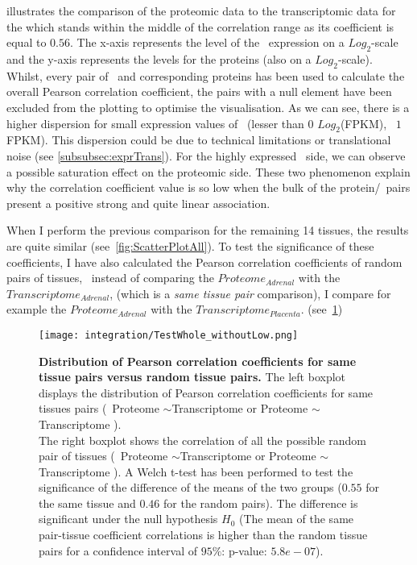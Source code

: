  illustrates the comparison of the proteomic data to the
transcriptomic data for the  which stands within the middle of the
correlation range as its coefficient is equal to $0.56$.
The x-axis represents the level of the \mRNAs\
expression on a $Log_{2}$-scale and the y-axis represents the levels for the
proteins (also on a $Log_{2}$-scale). Whilst, every pair of \mRNA\ and
corresponding proteins has been used to calculate the overall Pearson correlation
coefficient, the pairs with a null element have been excluded from the plotting
to optimise the visualisation. As we can see, there is a higher dispersion for
small expression values of \mRNAs\ (lesser than $0$ $Log_{2}$(FPKM), \ie\
$1$ FPKM). This dispersion could be due to technical limitations or translational
noise (see \cref{subsubsec:exprTrans}). For the highly expressed \mRNAs\ side,
we can observe a possible saturation effect on the proteomic side. These two
phenomenon explain why the correlation coefficient value is so low when the
bulk of the protein/\mRNA\ pairs present a positive strong and quite linear
association.

When I perform the previous comparison for the remaining 14 tissues, the results are
quite similar (see~\cref{fig:ScatterPlotAll}). To test the significance of these
coefficients, I have also calculated the Pearson correlation coefficients of
random pairs of tissues, \ie\ instead of comparing the $Proteome_{Adrenal}$ with
the $Transcriptome_{Adrenal}$, (which is a \emph{same tissue pair} comparison),
I compare for example the $Proteome_{Adrenal}$ with the $Transcriptome_{Placenta}$.
(see~\cref{fig:TestSig})

\begin{figure}[!htbp]
    \texttt{[image: integration/TestWhole\_withoutLow.png]}\centering
    \caption[Distribution of Pearson correlation coefficients for same tissue
    pairs versus random tissue pairs]{\label{fig:TestSig}\textbf{Distribution of
    Pearson correlation coefficients for same tissue pairs versus random tissue
    pairs.} The left boxplot displays the distribution of Pearson correlation
    coefficients for same tissues pairs (\eg\
Proteome\textsubscript{ }$\sim$Transcriptome\textsubscript{ }
or
Proteome\textsubscript{ }$\sim$Transcriptome\textsubscript{ }).
    \\The right boxplot shows the correlation of all the possible random
    pair of tissues (\eg\
Proteome\textsubscript{ }$\sim$Transcriptome\textsubscript{ }
or
Proteome\textsubscript{\tissue{Heart} }$\sim$Transcriptome\textsubscript{ }).
    A Welch t-test has been performed to test the significance of the
    difference of the means of the two groups ($0.55$ for the same tissue and
    $0.46$ for the random pairs). The difference is significant under the null
    hypothesis $H_{0}$ (The mean of the same pair-tissue coefficient correlations
    is higher than the random tissue pairs for a confidence interval of $95\%$:
    p-value: $5.8e-07$).}
\end{figure}

